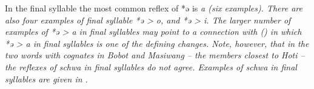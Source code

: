 
In the final syllable the most common reflex of *ə is \it{a} (six examples).
There are also four examples of final syllable *ə > \it{o},
and *ə > \it{i}.
The larger number of  examples of *ə > \it{a} in final syllables
may point to a connection with 
() in which *ə > \it{a} in final syllables is one
of the defining changes.
Note, however, that in the two words with cognates in Bobot
and Masiwang -- the members  closest
to Hoti -- the reflexes of schwa in final syllables do not agree.
Examples of schwa in final syllables are given in .
\\

